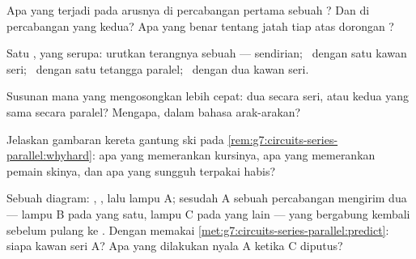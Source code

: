 \begin{exercise}[$\star$]\label{exo:g7:circuits-series-parallel:5}
Apa yang terjadi pada arusnya di percabangan pertama sebuah ? Dan di percabangan yang kedua? Apa yang benar tentang jatah
tiap  atas dorongan ?
\end{exercise}

\begin{exercise}[$\star$]\label{exo:g7:circuits-series-parallel:6}
Satu ,  yang serupa: urutkan terangnya sebuah  ---
sendirian; \ dengan satu kawan seri; \ dengan satu tetangga paralel;
\ dengan dua kawan seri.
\end{exercise}

\begin{exercise}[$\star$]\label{exo:g7:circuits-series-parallel:7}
Susunan mana yang mengosongkan  lebih cepat: dua 
secara seri, atau kedua  yang sama secara paralel? Mengapa,
dalam bahasa arak-arakan?
\end{exercise}

\begin{exercise}[$\star$]\label{exo:g7:circuits-series-parallel:8}
Jelaskan gambaran kereta gantung ski pada
\cref{rem:g7:circuits-series-parallel:whyhard}: apa yang memerankan
kursinya, apa yang memerankan pemain skinya, dan apa yang sungguh
terpakai habis?
\end{exercise}

\begin{exercise}[$\star\star$]\label{exo:g7:circuits-series-parallel:9}
Sebuah diagram: , , lalu lampu A; sesudah A sebuah
percabangan mengirim dua  --- lampu B pada yang satu, lampu C
pada yang lain --- yang bergabung kembali sebelum pulang ke
. Dengan memakai
\cref{met:g7:circuits-series-parallel:predict}: siapa kawan seri A?
Apa yang dilakukan nyala A ketika  C diputus?
\end{exercise}

